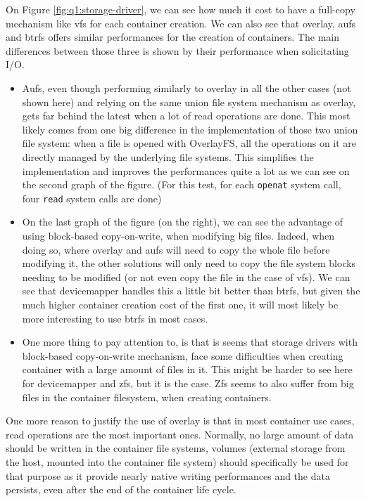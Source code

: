 On Figure \ref{fig:q1:storage-driver}, we can see how much it cost to have a full-copy mechanism like vfs for each container creation.  We can also see that overlay, aufs and btrfs offers similar performances for the creation of containers.  The main differences between those three is shown by their performance when solicitating I/O.  
\begin{itemize}
  \item Aufs, even though performing similarly to overlay in all the other cases (not shown here) and relying on the same union file system mechanism as overlay, gets far behind the latest when a lot of read operations are done.  This most likely comes from one big difference in the implementation of those two union file system: when a file is opened with OverlayFS, all the operations on it are directly managed by the underlying file systems.  This simplifies the implementation and improves the performances quite a lot as we can see on the second graph of the figure.  (For this test, for each \texttt{openat} system call, four \texttt{read} system calls are done)
  \item On the last graph of the figure (on the right), we can see the advantage of using block-based copy-on-write, when modifying big files.  Indeed, when doing so, where overlay and aufs will need to copy the whole file before modifying it, the other solutions will only need to copy the file system blocks needing to be modified (or not even copy the file in the case of vfs).  We can see that devicemapper handles this a little bit better than btrfs, but given the much higher container creation cost of the first one, it will most likely be more interesting to use btrfs in most cases.
  \item One more thing to pay attention to, is that is seems that storage drivers with block-based copy-on-write mechanism, face some difficulties when creating container with a large amount of files in it.  This might be harder to see here for devicemapper and zfs, but it is the case.  Zfs seems to also suffer from big files in the container filesystem, when creating containers.
\end{itemize}
One more reason to justify the use of overlay is that in most container use cases, read operations are the most important ones.  Normally, no large amount of data should be written in the container file systems, volumes (external storage from the host, mounted into the container file system) should specifically be used for that purpose as it provide nearly native writing performances and the data persists, even after the end of the container life cycle.

